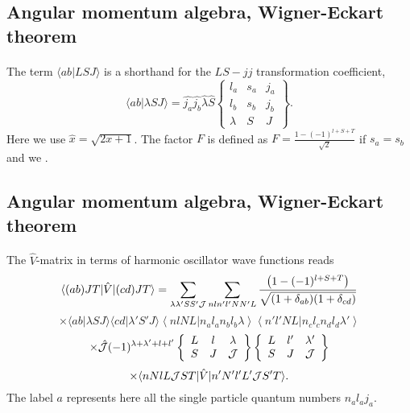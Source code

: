 \documentclass[%
twoside,                 %
final,                   %
10pt]{article}
\begin{document}
\subsection*{Angular momentum algebra, Wigner-Eckart theorem}

\paragraph{}
The term $\langle ab|LSJ \rangle $ is a shorthand
for the $LS-jj$ transformation coefficient,
\[
     \langle ab|\lambda SJ \rangle = \hat{j_{a}}\hat{j_{b}}
     \hat{\lambda}\hat{S}
     \left\{
    \begin{array}{ccc}
       l_{a}&s_a&j_{a}\\
       l_{b}&s_b&j_{b}\\
       \lambda    &S          &J
    \end{array}
    \right\}.
\]
Here
we use $\hat{x} = \sqrt{2x +1}$.
The factor $F$ is defined as $F=\frac{1-(-1)^{l+S+T}}{\sqrt{2}}$ if
$s_a = s_b$ and we .



\subsection*{Angular momentum algebra, Wigner-Eckart theorem}

\paragraph{}
The $\hat{V}$-matrix in terms of harmonic oscillator wave functions reads
\[
  \langle (ab)JT|\hat{V}|(cd)JT\rangle=
  {\displaystyle \sum_{\lambda \lambda ' SS' {\cal J}}\sum_{nln'l'NN'L}
  \frac{\left(1-(-1)^{l+S+T}\right)}{\sqrt{(1+\delta_{ab})
  (1+\delta_{cd})}}}
\]
\[
  \times\langle ab|\lambda SJ\rangle \langle cd|\lambda 'S'J\rangle
  \left\langle nlNL| n_{a}l_{a}n_{b}l_{b}\lambda\right\rangle
  \left\langle n'l'NL| n_{c}l_{c}n_{d}l_{d}\lambda ' \right\rangle
\]
\[
 \times \hat{{\cal J}}(-1)^{\lambda + \lambda ' +l +l'}
  \left\{\begin{array}{ccc}L&l&\lambda\\S&J&{\cal J}
  \end{array}\right\}
  \left\{\begin{array}{ccc}L&l'&\lambda '\\S&J&{\cal J}
  \end{array}\right\}
\]
\[
 \times\langle nNlL{\cal J}ST\vert\hat{V}\vert n'N'l'L'{\cal J}S'T\rangle.
\]
The label $a$ represents here all the single particle quantum numbers  
$n_{a}l_{a}j_{a}$.






\printindex
\end{document}
